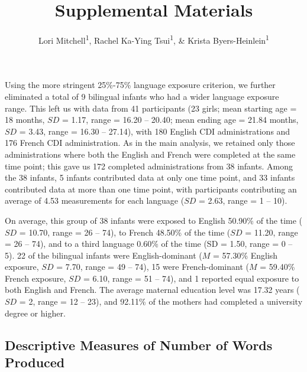 \documentclass[
  ,man,floatsintext]{apa6}
\title{Supplemental Materials}
\author{Lori Mitchell\textsuperscript{1}, Rachel Ka-Ying Tsui\textsuperscript{1}, \& Krista Byers-Heinlein\textsuperscript{1}}
\date{}
\affiliation{\vspace{0.5cm}\textsuperscript{1} Concordia University}
\begin{document}
\maketitle

\captionsetup[table]{labelformat=empty}

Using the more stringent 25\%-75\% language exposure criterion, we further eliminated a total of 9 bilingual infants who had a wider language exposure range. This left us with data from 41 participants (23 girls; mean starting age = 18 months, \(SD\) = 1.17, range = 16.20 -- 20.40; mean ending age = 21.84 months, \(SD\) = 3.43, range = 16.30 -- 27.14), with 180 English CDI administrations and 176 French CDI administration. As in the main analysis, we retained only those administrations where both the English and French were completed at the same time point; this gave us 172 completed administrations from 38 infants. Among the 38 infants, 5 infants contributed data at only one time point, and 33 infants contributed data at more than one time point, with participants contributing an average of 4.53 measurements for each language (\(SD\) = 2.63, range = 1 -- 10).

On average, this group of 38 infants were exposed to English 50.90\% of the time (\(SD\) = 10.70, range = 26 -- 74), to French 48.50\% of the time (\(SD\) = 11.20, range = 26 -- 74), and to a third language 0.60\% of the time (SD = 1.50, range = 0 -- 5). 22 of the bilingual infants were English-dominant (\(M\) = 57.30\% English exposure, \(SD\) = 7.70, range = 49 -- 74), 15 were French-dominant (\(M\) = 59.40\% French exposure, \(SD\) = 6.10, range = 51 -- 74), and 1 reported equal exposure to both English and French. The average maternal education level was 17.32 years (\(SD\) = 2, range = 12 -- 23), and 92.11\% of the mothers had completed a university degree or higher.

\hypertarget{descriptive-measures-of-number-of-words-produced}{%
\subsection{Descriptive Measures of Number of Words Produced}\label{descriptive-measures-of-number-of-words-produced}}
\end{document}
